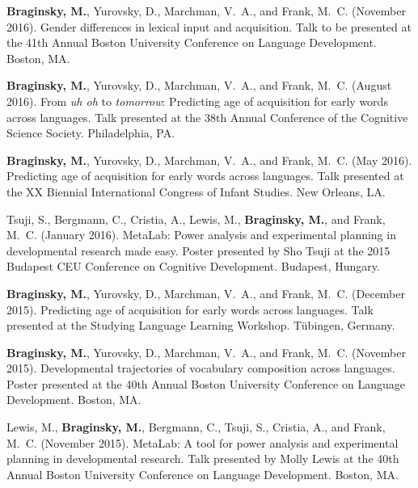 \documentclass[11pt,letter]{moderncv}
\begin{document}
\begin{small}
\begin{thebibliography}{}

\textbf{Braginsky, M.}, Yurovsky, D., Marchman, V.~A., and Frank, M.~C. (November 2016).
\newblock Gender differences in lexical input and acquisition.
\newblock Talk to be presented at the 41th Annual Boston University
  Conference on Language Development.
  Boston, MA.

\textbf{Braginsky, M.}, Yurovsky, D., Marchman, V.~A., and Frank, M.~C. (August 2016).
\newblock From \emph{uh oh} to \emph{tomorrow}: Predicting age of acquisition for early words across languages.
\newblock Talk presented at the 38th Annual Conference of the Cognitive Science Society.
  Philadelphia, PA.

\textbf{Braginsky, M.}, Yurovsky, D., Marchman, V.~A., and Frank, M.~C. (May 2016).
\newblock Predicting age of acquisition for early words across languages.
\newblock Talk presented at the XX Biennial International Congress of Infant Studies.
	New Orleans, LA.
  
Tsuji, S., Bergmann, C., Cristia, A., Lewis, M., \textbf{Braginsky, M.}, and Frank, M.~C. (January 2016).
\newblock MetaLab: Power analysis and experimental planning in developmental research made easy.
\newblock Poster presented by Sho Tsuji at the 2015 Budapest CEU Conference on Cognitive Development.
  Budapest, Hungary.

\textbf{Braginsky, M.}, Yurovsky, D., Marchman, V.~A., and Frank, M.~C. (December 2015).
\newblock Predicting age of acquisition for early words across languages.
\newblock Talk presented at the Studying Language Learning Workshop.
  T{\"u}bingen, Germany.
  
\textbf{Braginsky, M.}, Yurovsky, D., Marchman, V.~A., and Frank, M.~C. (November 2015).
\newblock Developmental trajectories of vocabulary composition across languages.
\newblock Poster presented at the 40th Annual Boston University
  Conference on Language Development.
  Boston, MA.
  
Lewis, M., \textbf{Braginsky, M.}, Bergmann, C., Tsuji, S., Cristia, A., and Frank, M.~C. (November 2015).
\newblock MetaLab: A tool for power analysis and experimental planning in developmental research.
\newblock Talk presented by Molly Lewis at the 40th Annual Boston University
  Conference on Language Development.
  Boston, MA.
  

\end{thebibliography}
\end{small}
\end{document}
